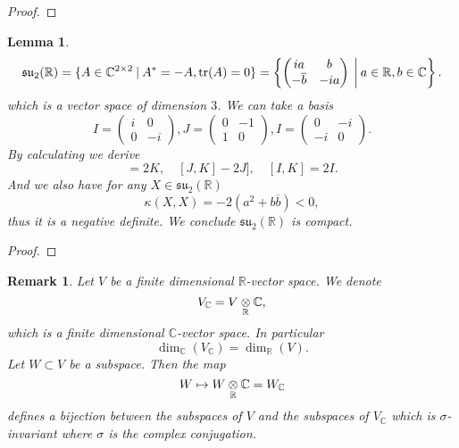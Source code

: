 \documentclass{article}
\newtheorem{lemma}{Lemma}[section]
\newtheorem{remark}{Remark}[section]
\numberwithin{equation}{section}
\DeclareMathOperator{\tr}{tr}
\newcommand{\tens}[1]{%
  \mathbin{\mathop{\otimes}\displaylimits_{#1}}%
}
\begin{document}
\begin{proof}
\end{proof}

\begin{lemma}
\begin{equation*}
\mathfrak{su}_2(\mathbb{R})=\{A\in\mathbb{C}^{2\times 2}\:|\: A^* = -A,\tr(A) = 0\} = \left\{\begin{pmatrix}ia&b\\-\overline{b}&-ia\end{pmatrix}\:\bigg{|}\: a\in\mathbb{R},b\in\mathbb{C}\right\}.
\end{equation*}
which is a vector space of dimension $3$. We can take a basis
\begin{equation*}
I = \begin{pmatrix}i&0\\0&-i\end{pmatrix},J = \begin{pmatrix}0&-1\\1&0\end{pmatrix},I = \begin{pmatrix}0&-i\\-i&0\end{pmatrix}.
\end{equation*}
By calculating we derive
\begin{equation*}
[I,J]=2K,\quad [J,K]-2J],\quad [I,K]=2I.
\end{equation*}
And we also have for any $X\in\mathfrak{su}_2(\mathbb{R})$
\begin{equation*}
\kappa(X,X) = -2(a^2+b\overline{b})<0,
\end{equation*}
thus it is a negative definite. We conclude $\mathfrak{su}_2(\mathbb{R})$ is compact.
\end{lemma}

\begin{proof}
\end{proof}

\begin{remark}
Let $V$ be a finite dimensional $\mathbb{R}$-vector space. We denote
\begin{equation*}
V_{\mathbb{C}} = V\tens{\mathbb{R}}\mathbb{C},
\end{equation*}
which is a finite dimensional $\mathbb{C}$-vector space. In particular 
\begin{equation*}
\dim_\mathbb{C}(V_\mathbb{C}) = \dim_\mathbb{R}(V).
\end{equation*}
Let $W\subset V$ be a subspace. Then the map
\begin{equation*}
W\mapsto W\tens{\mathbb{R}}\mathbb{C} = W_{\mathbb{C}}
\end{equation*}
defines a bijection between the subspaces of $V$ and the subspaces of $V_\mathbb{C}$ which is $\sigma$-invariant where
$\sigma$ is the complex conjugation.
\end{remark}
\end{document}
